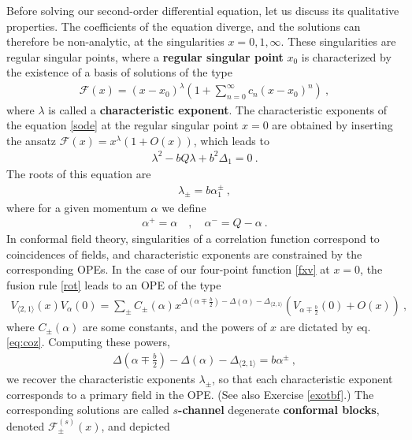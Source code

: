 \documentclass[12pt, a4paper, notitlepage, twoside]{report}
\numberwithin{equation}{section}
\theoremstyle{break}
\begin{document}
Before solving our second-order differential equation, let us discuss its qualitative properties.
The coefficients of the equation diverge, and the solutions can therefore be non-analytic, at the singularities $x=0,1,\infty$.
These singularities are regular singular points, where a \textbf{regular singular point} $x_0$ is characterized by the existence of a basis of solutions of the type  
\begin{align}
 \mathcal{F}(x)=(x-x_0)^\lambda\left(1+\sum_{n=0}^\infty c_n (x-x_0)^n\right)\ ,
\label{zxl}
\end{align}
where $\lambda$ is called a \textbf{\boldmath characteristic exponent}.
The characteristic exponents of the equation \eqref{sode} at the regular singular point $x=0$ are obtained by inserting the ansatz $\mathcal{F}(x) = x^\lambda(1+O(x))$, which leads to 
\begin{align}
 \lambda^2 - bQ\lambda + b^2 \Delta_1 = 0 \ .
\end{align}
The roots of this equation are 
\begin{align}
 \lambda_\pm = b\alpha_1^\pm \ , 
\label{lpm}
\end{align}
where for a given momentum $\alpha$ we define 
\begin{align}
 \alpha^+ = \alpha \quad , \quad \alpha^- = Q-\alpha\ .
\label{apm}
\end{align}
In conformal field theory, singularities of a correlation function correspond to coincidences of fields, and characteristic exponents are constrained by the corresponding OPEs.
In the case of our four-point function \eqref{fxv} at $x=0$, the fusion rule \eqref{rot} leads to an OPE of the type
\begin{align}
 V_{\langle 2,1 \rangle}(x)V_{\alpha}(0) = \sum_\pm C_\pm(\alpha) x^{\Delta\left(\alpha\mp \frac{b}{2}\right) -\Delta(\alpha) - \Delta_{\langle 2,1 \rangle}} \left(V_{\alpha\mp\frac{b}{2}}(0) + O(x)\right)\ ,
\end{align}
where $C_\pm(\alpha)$ are some constants, and the powers of $x$ are dictated by eq. \eqref{eq:coz}. 
Computing these powers,
\begin{align}
 \Delta\left(\alpha\mp \frac{b}{2}\right) -\Delta(\alpha) - \Delta_{\langle 2,1 \rangle}  = b \alpha^{\pm}\ ,
\end{align}
we recover the characteristic exponents $\lambda_\pm$, so that each characteristic exponent corresponds to a primary field in the OPE.
(See also Exercise \ref{exotbf}.) The corresponding solutions are called \textbf{\boldmath $s$-channel} degenerate \textbf{conformal blocks}, denoted $\mathcal{F}^{(s)}_\pm(x)$, and depicted
\end{document}
